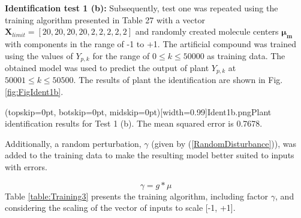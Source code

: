 \documentclass{ieeeaccess}
\begin{document}
\textbf{Identification test 1 (b):} Subsequently, test one was repeated using the training algorithm presented in Table 27 with a vector \(\mathbf{X}_{limit}=[20,20, 20,20,2,2,2,2,2]\) and randomly created molecule centers \(\mathbf{\mu_m}\) with components in the range of -1 to +1. The artificial compound was trained using the values of \(Y_{p,k}\) for the range of \(0\le k\le50000\) as training data. The obtained model was used to predict the output of plant \(Y_{p,k}\) at \(50001\le k\le50500\). The results of plant the identification are shown in Fig.\ref{fig:FigIdent1b}.

\Figure[ht!](topskip=0pt, botskip=0pt, midskip=0pt)[width=0.99\columnwidth]{Ident1b.png}{Plant identification results for Test 1 (b). The mean squared error is 0.7678\label{fig:FigIdent1b}.}

Additionally, a random perturbation, \(\gamma\) (given by (\ref{RandomDisturbance})), was added to the training data to make the resulting model better suited to inputs with errors.

\begin{equation}\label{RandomDisturbance}
\gamma=g\ast\mu
\end{equation}
Table \ref{table:Training3} presents the training algorithm, including factor \(\gamma\), and considering the scaling of the vector of inputs to scale [-1, +1].
\end{document}

